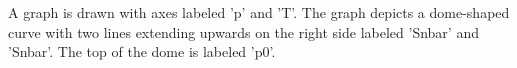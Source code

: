 A graph is drawn with axes labeled 'p' and 'T'. The graph depicts a dome-shaped curve with two lines extending upwards on the right side labeled 'Snbar' and 'Snbar'. The top of the dome is labeled 'p0'.